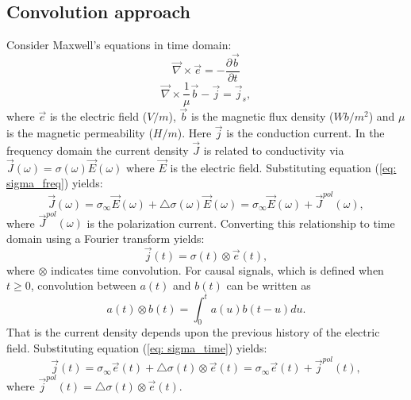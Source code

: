 \documentclass[a4paper, 11pt]{article}
\newcommand{\curl}{{\vec \nabla}\times}
\newcommand {\J}{{\vec J}}
\newcommand {\E}{{\vec E}}
\newcommand{\siginf}{\sigma_\infty}
\newcommand{\dsig}{\triangle\sigma}
\renewcommand {\j}  { {\vec j} }
\renewcommand {\b}  { {\vec b} }
\newcommand {\e}  { {\vec e} }
\begin{document}
\subsection{Convolution approach}
Consider Maxwell's equations in time domain:
\begin{equation}
  \curl{\e} = -\frac{\partial \b}{\partial t}
  \label{eq: total_farad}
\end{equation}
\begin{equation}
  \curl{\frac{1}{\mu}\b} - \j= \j_{s},
  \label{eq: total_coulomb}
\end{equation}
where $\e$ is the electric field ($V/m$), $\b$ is the magnetic flux density ($Wb/m^2$) and $\mu$ is the magnetic permeability ($H/m$). Here $\j$ is the conduction current. In the frequency domain the current density $\J$ is related to conductivity via $\J(\omega) = \sigma(\omega)\E(\omega)$ where $\E$ is the electric field. Substituting equation (\ref{eq: sigma_freq}) yields:
\begin{equation}
	\J(\omega) = \siginf\E(\omega)+\triangle\sigma(\omega)\E(\omega) =\siginf\E(\omega)+\vec{J}^{pol}(\omega),
\end{equation}
where $\J^{pol}(\omega)$ is the polarization current.
Converting this relationship to time domain using a Fourier transform yields:
\begin{equation}
	\j(t) = \sigma(t)\otimes \e(t),
	\label{eq: ohmslaw1}
\end{equation}
where $\otimes$ indicates time convolution. For causal signals, which is defined when $t \ge 0$, convolution between $a(t)$ and $b(t)$ can be written as
\begin{equation}
	a(t) \otimes b(t) = \int_0^t a(u) b(t-u) du.
	\label{eq: convolution}
\end{equation}
That is the current density depends upon the previous history of the electric field. Substituting equation (\ref{eq: sigma_time}) yields:
\begin{equation}
	\j(t) = \siginf\e(t) + \dsig(t)\otimes\e(t) = \siginf\e(t) + \j^{pol}(t),
	\label{eq: ohmslaw2}
\end{equation}
where $\j^{pol}(t) = \dsig(t)\otimes\e(t)$.
\end{document}
